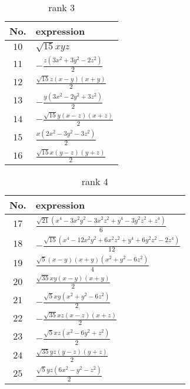\documentclass[fleqn,8pt,landscape]{jsarticle}
\begin{document}
\begin{table}[ht!]
\begin{center}
\caption{rank 3}
\renewcommand{\arraystretch}{1.3}
\begin{tabular}{cl} \hline \hline
No. & expression \\ \hline
$ 10 $ & $ \sqrt{15} x y z $ \\
$ 11 $ & $ - \frac{z \left(3 x^{2} + 3 y^{2} - 2 z^{2}\right)}{2} $ \\
$ 12 $ & $ \frac{\sqrt{15} z \left(x - y\right) \left(x + y\right)}{2} $ \\
$ 13 $ & $ - \frac{y \left(3 x^{2} - 2 y^{2} + 3 z^{2}\right)}{2} $ \\
$ 14 $ & $ - \frac{\sqrt{15} y \left(x - z\right) \left(x + z\right)}{2} $ \\
$ 15 $ & $ \frac{x \left(2 x^{2} - 3 y^{2} - 3 z^{2}\right)}{2} $ \\
$ 16 $ & $ \frac{\sqrt{15} x \left(y - z\right) \left(y + z\right)}{2} $ \\
 \hline \hline
\end{tabular}
\end{center}
\end{table}
\begin{table}[ht!]
\begin{center}
\caption{rank 4}
\renewcommand{\arraystretch}{1.3}
\begin{tabular}{cl} \hline \hline
No. & expression \\ \hline
$ 17 $ & $ \frac{\sqrt{21} \left(x^{4} - 3 x^{2} y^{2} - 3 x^{2} z^{2} + y^{4} - 3 y^{2} z^{2} + z^{4}\right)}{6} $ \\
$ 18 $ & $ - \frac{\sqrt{15} \left(x^{4} - 12 x^{2} y^{2} + 6 x^{2} z^{2} + y^{4} + 6 y^{2} z^{2} - 2 z^{4}\right)}{12} $ \\
$ 19 $ & $ \frac{\sqrt{5} \left(x - y\right) \left(x + y\right) \left(x^{2} + y^{2} - 6 z^{2}\right)}{4} $ \\
$ 20 $ & $ \frac{\sqrt{35} x y \left(x - y\right) \left(x + y\right)}{2} $ \\
$ 21 $ & $ - \frac{\sqrt{5} x y \left(x^{2} + y^{2} - 6 z^{2}\right)}{2} $ \\
$ 22 $ & $ - \frac{\sqrt{35} x z \left(x - z\right) \left(x + z\right)}{2} $ \\
$ 23 $ & $ - \frac{\sqrt{5} x z \left(x^{2} - 6 y^{2} + z^{2}\right)}{2} $ \\
$ 24 $ & $ \frac{\sqrt{35} y z \left(y - z\right) \left(y + z\right)}{2} $ \\
$ 25 $ & $ \frac{\sqrt{5} y z \left(6 x^{2} - y^{2} - z^{2}\right)}{2} $ \\
 \hline \hline
\end{tabular}
\end{center}
\end{table}
\end{document}
